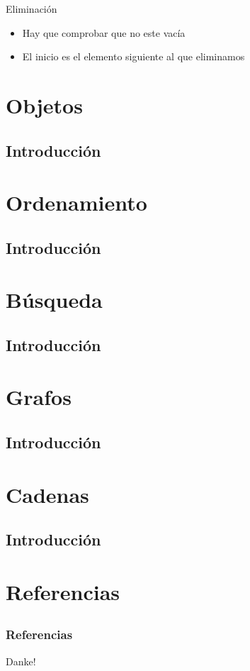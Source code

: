 \documentclass{beamer}
\begin{document}
\begin{frame}{Eliminaci\'on}
	\begin{itemize}
		\item Hay que comprobar que no este vac\'ia
		\item El inicio es el elemento siguiente al que eliminamos
	\end{itemize}
\end{frame}

\section{Objetos}
\subsection{Introducci\'on}

\section{Ordenamiento}
\subsection{Introducci\'on}

\section{B\'usqueda}
\subsection{Introducci\'on}

\section{Grafos}
\subsection{Introducci\'on}

\section{Cadenas}
\subsection{Introducci\'on}

\section{Referencias}
\subsection{}
\begin{frame}[allowframebreaks]
    
    \frametitle{Referencias}
    
    
\end{frame}

\begin{frame}
    \begin{center}
        {\Huge\calligra Danke!}
    \end{center}
\end{frame}
\end{document}
